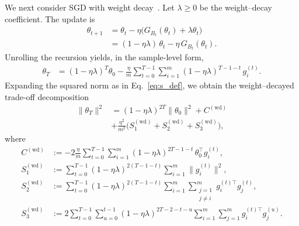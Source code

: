 We next consider SGD with weight decay~\cite{krogh1991simple,loshchilov2017decoupled}. Let $\lambda\ge 0$ be the weight--decay coefficient. The update is%
\begin{equation}
\label{eq:weight_decay_updates}
\begin{aligned}
\theta_{t+1}
&= \theta_t-\eta\bigl(G_{B_t}(\theta_t)+\lambda\theta_t\bigr)\\
&= (1-\eta\lambda)\,\theta_t-\eta\,G_{B_t}(\theta_t).
\end{aligned}
\end{equation}
Unrolling the recursion yields, in the sample-level form, %
\begin{equation}
\begin{aligned}
\theta_T
&= (1-\eta\lambda)^T\theta_0
-\frac{\eta}{m}\sum_{t=0}^{T-1}\sum_{i=1}^m (1-\eta\lambda)^{T-1-t}\,g_i^{(t)}.
\label{eq:wd_theta_T}
\end{aligned}
\end{equation}
%
Expanding the squared norm as in Eq.~\eqref{eq:s_def}, we obtain the weight--decayed trade-off decomposition
\begin{equation}
\begin{aligned}  
\label{eq:thetaT_full_wd}
\|\theta_T\|^{2}
&=(1-\eta\lambda)^{2T}\|\theta_0\|^{2}
+ C^{(\mathrm{wd})} \\
&+\frac{\eta^{2}}{m^{2}}\bigl(S_1^{(\mathrm{wd})}+S_2^{(\mathrm{wd})}+S_3^{(\mathrm{wd})}\bigr),
\end{aligned}
\end{equation}
where
\begin{align}
C^{(\mathrm{wd})}
&:=
-2\frac{\eta}{m}\sum_{t=0}^{T-1}\sum_{i=1}^{m}(1-\eta\lambda)^{2T-1-t}\,\theta_0^{\top}g_i^{(t)},
\label{eq:C_wd}\\
S_1^{(\mathrm{wd})}
&:=
\sum_{t=0}^{T-1}(1-\eta\lambda)^{2(T-1-t)}\sum_{i=1}^{m}\|g_i^{(t)}\|^2,
\label{eq:S1_wd}\\
S_2^{(\mathrm{wd})}
&:=
\sum_{t=0}^{T-1}(1-\eta\lambda)^{2(T-1-t)}\sum_{i=1}^{m}\sum_{\substack{j=1\\ j\neq i}}^{m} g_i^{(t)\top}g_j^{(t)},
\label{eq:S2_wd}\\
S_3^{(\mathrm{wd})}
&:=
2\sum_{t=0}^{T-1}\sum_{u=0}^{t-1}(1-\eta\lambda)^{2T-2-t-u}\sum_{i=1}^{m}\sum_{j=1}^{m} g_i^{(t)\top}g_j^{(u)}.
\label{eq:S3_wd}
\end{align}
